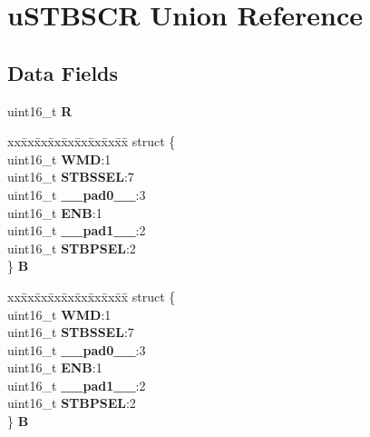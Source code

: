\hypertarget{unionuSTBSCR}{}\section{u\+S\+T\+B\+S\+CR Union Reference}
\label{unionuSTBSCR}
\subsection*{Data Fields}
\begin{DoxyCompactItemize}
\item 
\mbox{\label{unionuSTBSCR_abba404e7ecab9699dc68a6761a9ee7cf}} 
uint16\+\_\+t {\bfseries R}
\item 
\mbox{\label{unionuSTBSCR_aae24992f644b88a4b25ef4d9e2be08ff}} 
\begin{tabbing}
xx\=xx\=xx\=xx\=xx\=xx\=xx\=xx\=xx\=\kill
struct \{\\
\>uint16\_t {\bfseries WMD}:1\\
\>uint16\_t {\bfseries STBSSEL}:7\\
\>uint16\_t {\bfseries \_\_pad0\_\_}:3\\
\>uint16\_t {\bfseries ENB}:1\\
\>uint16\_t {\bfseries \_\_pad1\_\_}:2\\
\>uint16\_t {\bfseries STBPSEL}:2\\
\} {\bfseries B}\\

\end{tabbing}\item 
\mbox{\label{unionuSTBSCR_a2794d9b4e314d4af137904dd61948699}} 
\begin{tabbing}
xx\=xx\=xx\=xx\=xx\=xx\=xx\=xx\=xx\=\kill
struct \{\\
\>uint16\_t {\bfseries WMD}:1\\
\>uint16\_t {\bfseries STBSSEL}:7\\
\>uint16\_t {\bfseries \_\_pad0\_\_}:3\\
\>uint16\_t {\bfseries ENB}:1\\
\>uint16\_t {\bfseries \_\_pad1\_\_}:2\\
\>uint16\_t {\bfseries STBPSEL}:2\\
\} {\bfseries B}\\


\end{tabbing}
\end{DoxyCompactItemize}
